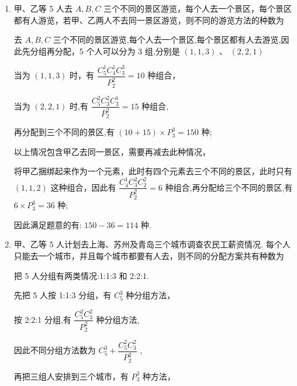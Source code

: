 \begin{enumerate}
\begin{enumerate}
\begin{jieda}
            由分类加法计数原理, 可得不同分配方案有 90 + 60 = 150 种.
        \end{jieda}

        
        \item 甲、乙等 5 人去 $A,B,C$ 三个不同的景区游览，每个人去一个景区，每个景区都有人游览，若甲、乙两人不去同一景区游览，则不同的游览方法的种数为
        \begin{jieda}
            去 $A,B,C$ 三个不同的景区游览,每个人去一个景区,每个景区都有人去游览,因此先分组再分配，5 个人可以分为 3 组,分别是 $\left( {1,1,3}\right) \text{ 、 }\left( {2,2,1}\right)$ 
            
            当为 $\left( {1,1,3}\right)$ 时，有 $\dfrac{{{C}}_{5}^{1}{{C}}_{4}^{1}{{C}}_{3}^{3}}{P_{2}^{2}} = {10}$ 种组合，
            
            当为 $\left( {2,2,1}\right)$ 时,有 $\dfrac{{{C}}_{5}^{2}{{C}}_{3}^{2}{{C}}_{3}^{1}}{P_{2}^{2}} = {15}$ 种组合,
            
            再分配到三个不同的景区,有 $\left( {{10} + {15}}\right)  \times  P_{3}^{3} = {150}$ 种;
            
            以上情况包含甲乙去同一景区，需要再减去此种情况，
            
            将甲乙捆绑起来作为一个元素，此时有四个元素去三个不同的景区，此时只有 $\left( {1,1,2}\right)$ 这种组合，因此有 $\dfrac{{{C}}_{4}^{1}{{C}}_{3}^{2}{{C}}_{2}^{2}}{P_{2}^{2}} = 6$ 种组合,再分配给三个不同的景区,有 $6 \times  P_{3}^{3} = {36}$ 种;
            
            因此满足题意的有: ${150} - {36} = {114}$ 种.
        \end{jieda}
        
        
        \item 甲、乙等 5 人计划去上海、苏州及青岛三个城市调查农民工薪资情况. 每个人只能去一个城市，并且每个城市都要有人去，则不同的分配方案共有种数为
        \begin{jieda}
            把 5 人分组有两类情况:1:1:3 和 2:2:1.
            
            先把 5 人按 1:1:3 分组，有 ${{C}}_{5}^{3}$ 种分组方法，
            
            按 2:2:1 分组,有 $\dfrac{{{C}}_{5}^{2}{{C}}_{3}^{2}}{P_{2}^{2}}$ 种分组方法,
            
            因此不同分组方法数为 ${{C}}_{5}^{3} + \dfrac{{{C}}_{5}^{2}{{C}}_{3}^{2}}{P_{2}^{2}}$ ,
            
            再把三组人安排到三个城市，有 $P_{3}^{3}$ 种方法，
            

\end{jieda}
\end{enumerate}
\end{enumerate}
